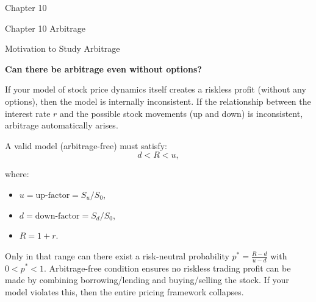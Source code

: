 \documentclass{beamer}
\begin{document}
\begin{frame}{Chapter 10}

    {
    \begin{center}
        Chapter 10 Arbitrage
    \end{center}
 
    }
    
\end{frame}
\begin{frame}{Motivation to Study Arbitrage}

    {\footnotesize \footnotesize
    \textbf{Can there be arbitrage even without options?}
    \vspace{1em}
    \par If your model of stock price dynamics itself creates a riskless profit (without any options), 
    then the model is internally inconsistent.  If the relationship between the interest rate \( r \)
    and the possible stock movements (up and down) is inconsistent, arbitrage automatically arises.
    \vspace{1em}
    \par A valid model (arbitrage-free) must satisfy:
\[
d < R < u,
\]

where:
\begin{itemize}
\item \( u = \text{up-factor} = S_u / S_0 \),
\item \( d = \text{down-factor} = S_d / S_0 \),
\item \( R = 1 + r \).
\end{itemize}

Only in that range can there exist a risk-neutral probability \( p^* = \frac{R-d}{u-d} \) with \( 0 < p^* < 1 \).
Arbitrage-free condition ensures no riskless trading profit 
can be made by combining borrowing/lending and buying/selling the stock.
If your model violates this, then the entire pricing framework collapses.

    }
\end{frame}
\end{document}
